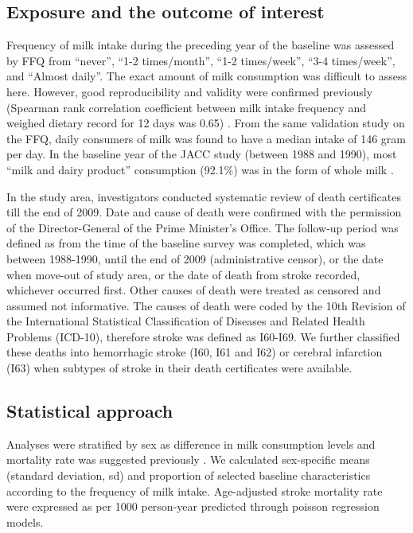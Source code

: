 \documentclass[nutrients,article,submitted,moreauthors,pdftex]{mdpi}
\begin{document}
\hypertarget{exposure-and-the-outcome-of-interest}{%
\subsection{Exposure and the outcome of
interest}\label{exposure-and-the-outcome-of-interest}}

Frequency of milk intake during the preceding year of the baseline was
assessed by FFQ from ``never'', ``1-2 times/month'', ``1-2 times/week'',
``3-4 times/week'', and ``Almost daily''. The exact amount of milk
consumption was difficult to assess here. However, good reproducibility
and validity were confirmed previously (Spearman rank correlation
coefficient between milk intake frequency and weighed dietary record for
12 days was 0.65) \citep{Date2005}. From the same validation study
\citep{Date2005} on the FFQ, daily consumers of milk was found to have a
median intake of 146 gram per day. In the baseline year of the JACC
study (between 1988 and 1990), most ``milk and dairy product''
consumption (92.1\%) was in the form of whole milk \citep{eigyogenjyo}.

In the study area, investigators conducted systematic review of death
certificates till the end of 2009. Date and cause of death were
confirmed with the permission of the Director-General of the Prime
Minister's Office. The follow-up period was defined as from the time of
the baseline survey was completed, which was between 1988-1990, until
the end of 2009 (administrative censor), or the date when move-out of
study area, or the date of death from stroke recorded, whichever
occurred first. Other causes of death were treated as censored and
assumed not informative. The causes of death were coded by the 10th
Revision of the International Statistical Classification of Diseases and
Related Health Problems (ICD-10), therefore stroke was defined as
I60-I69. We further classified these deaths into hemorrhagic stroke
(I60, I61 and I62) or cerebral infarction (I63) when subtypes of stroke
in their death certificates were available.

\hypertarget{statistical-approach}{%
\subsection{Statistical approach}\label{statistical-approach}}

Analyses were stratified by sex as difference in milk consumption levels
and mortality rate was suggested previously
\citep{wang_milk_2015, Talaei_2016}. We calculated sex-specific means
(standard deviation, sd) and proportion of selected baseline
characteristics according to the frequency of milk intake. Age-adjusted
stroke mortality rate were expressed as per 1000 person-year predicted
through poisson regression models.
\end{document}
